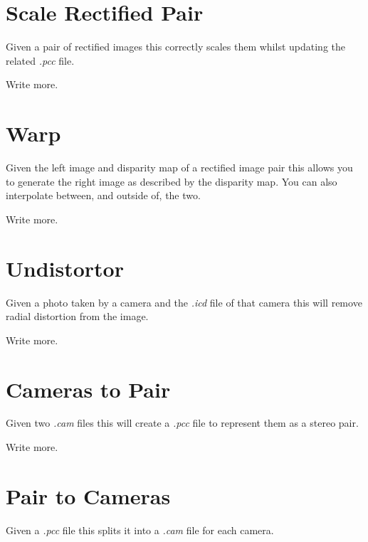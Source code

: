 \documentclass[10pt,a4paper,twoside]{article}
\begin{document}
\section{Scale Rectified Pair}
Given a pair of rectified images this correctly scales them whilst updating the related \emph{.pcc} file.

Write more.



\section{Warp}
Given the left image and disparity map of a rectified image pair this allows you to generate the right image as described by the disparity map. You can also interpolate between, and outside of, the two.

Write more.









\section{Undistortor}
Given a photo taken by a camera and the \emph{.icd} file of that camera this will remove radial distortion from the image.

Write more.



\section{Cameras to Pair}
Given two \emph{.cam} files this will create a \emph{.pcc} file to represent them as a stereo pair.

Write more.



\section{Pair to Cameras}
Given a \emph{.pcc} file this splits it into a \emph{.cam} file for each camera.
\end{document}
